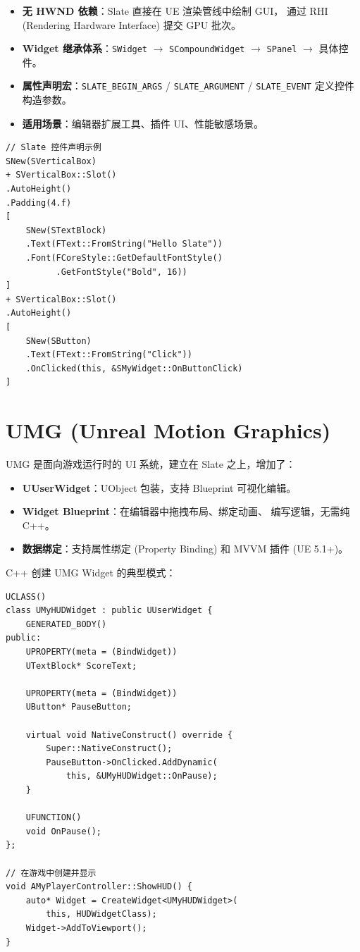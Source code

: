 \documentclass[12pt,a4paper,fontset=fandol]{ctexbook}
\newcommand{\cpplabel}{%
  \tcbox[on line,colback=cppheadbg,colframe=cppheadbg,
    boxrule=0pt,arc=1pt,left=2pt,right=2pt,top=1pt,bottom=1pt,
    colupper=white,fontupper=\scriptsize\bfseries]{C++}}
\newcommand{\Tp}[1]{\texttt{#1}}
\begin{document}
\begin{itemize}
  \item \textbf{无 HWND 依赖}：Slate 直接在 UE 渲染管线中绘制 GUI，
        通过 RHI (Rendering Hardware Interface) 提交 GPU 批次。
  \item \textbf{Widget 继承体系}：\Tp{SWidget} $\rightarrow$ \Tp{SCompoundWidget}
        $\rightarrow$ \Tp{SPanel} $\rightarrow$ 具体控件。
  \item \textbf{属性声明宏}：\Tp{SLATE\_BEGIN\_ARGS} / \Tp{SLATE\_ARGUMENT} /
        \Tp{SLATE\_EVENT} 定义控件构造参数。
  \item \textbf{适用场景}：编辑器扩展工具、插件 UI、性能敏感场景。
\end{itemize}

\cpplabel
\begin{lstlisting}[style=cppstyle]
// Slate 控件声明示例
SNew(SVerticalBox)
+ SVerticalBox::Slot()
.AutoHeight()
.Padding(4.f)
[
    SNew(STextBlock)
    .Text(FText::FromString("Hello Slate"))
    .Font(FCoreStyle::GetDefaultFontStyle()
          .GetFontStyle("Bold", 16))
]
+ SVerticalBox::Slot()
.AutoHeight()
[
    SNew(SButton)
    .Text(FText::FromString("Click"))
    .OnClicked(this, &SMyWidget::OnButtonClick)
]
\end{lstlisting}

\section{UMG (Unreal Motion Graphics)}

UMG 是面向游戏运行时的 UI 系统，建立在 Slate 之上，增加了：

\begin{itemize}
  \item \textbf{UUserWidget}：UObject 包装，支持 Blueprint 可视化编辑。
  \item \textbf{Widget Blueprint}：在编辑器中拖拽布局、绑定动画、
        编写逻辑，无需纯 C++。
  \item \textbf{数据绑定}：支持属性绑定 (Property Binding) 和
        MVVM 插件 (UE 5.1+)。
\end{itemize}

C++ 创建 UMG Widget 的典型模式：

\cpplabel
\begin{lstlisting}[style=cppstyle]
UCLASS()
class UMyHUDWidget : public UUserWidget {
    GENERATED_BODY()
public:
    UPROPERTY(meta = (BindWidget))
    UTextBlock* ScoreText;

    UPROPERTY(meta = (BindWidget))
    UButton* PauseButton;

    virtual void NativeConstruct() override {
        Super::NativeConstruct();
        PauseButton->OnClicked.AddDynamic(
            this, &UMyHUDWidget::OnPause);
    }

    UFUNCTION()
    void OnPause();
};

// 在游戏中创建并显示
void AMyPlayerController::ShowHUD() {
    auto* Widget = CreateWidget<UMyHUDWidget>(
        this, HUDWidgetClass);
    Widget->AddToViewport();
}
\end{lstlisting}
\end{document}
